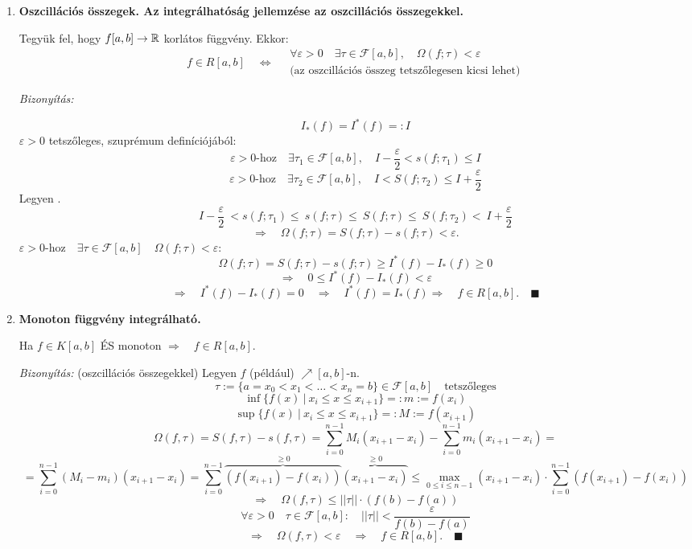 \documentclass[a4paper,11.5pt]{article}
\begin{document}
\begin{enumerate}
		\item\textbf{Oszcillációs összegek. Az integrálhatóság jellemzése az oszcillációs összegekkel.}
		\begin{framed}
			Tegyük fel, hogy $f[a,b]\to\mathbb{R}$ korlátos függvény. Ekkor:
			\[ f\in R[a,b]\quad \Leftrightarrow\quad \begin{gathered}
			\forall\varepsilon>0\quad \exists\tau\in\mathcal{F}[a,b],\quad  \varOmega(f;\tau)<\varepsilon\\
			\text{(az oszcillációs összeg tetszőlegesen kicsi lehet)}
			\end{gathered} \]
		\end{framed}
		\textit{Bizonyítás:}
		
		\fbox{$\Rightarrow:$}
		\[ I_*(f)=I^*(f)=:I \]
		$\varepsilon>0$ tetszőleges, szuprémum definíciójából:
		\[ \varepsilon>0\text{-hoz}\quad \exists\tau_1\in\mathcal{F}[a,b],\quad I-\frac{\varepsilon}{2}<s(f;\tau_1)\leq I \]
		\[ \varepsilon>0\text{-hoz}\quad \exists\tau_2\in\mathcal{F}[a,b],\quad I<S(f;\tau_2)\leq I+\frac{\varepsilon}{2} \]
		Legyen .
		\[ I-\frac{\varepsilon}{2}\ <s(f;\tau_1)\leq\  s(f;\tau)\leq\  S(f;\tau)\leq\  S(f;\tau_2)<\ I+\frac{\varepsilon}{2} \]
		\[ \Rightarrow\quad\varOmega(f;\tau)= S(f;\tau)-s(f;\tau)<\varepsilon. \]
		\fbox{$\Leftarrow:$}
		$\varepsilon>0\text{-hoz}\quad \exists\tau\in\mathcal{F}[a,b]\quad \varOmega(f;\tau)<\varepsilon:$
		\[ \varOmega(f;\tau)=S(f;\tau)-s(f;\tau)\geq I^*(f)-I_*(f)\geq 0 \]
		\[ \Rightarrow\quad 0\leq I^*(f)-I_*(f)<\varepsilon \]
		\[ \Rightarrow\quad I^*(f)-I_*(f)=0\quad \Rightarrow\quad I^*(f)=I_*(f)\Rightarrow\quad f\in R[a,b].\quad \blacksquare \]
		
		\item \textbf{Monoton függvény integrálható.}
		\begin{framed}
			\begin{center}	
				Ha $f\in K[a,b]$ ÉS monoton \quad $\Rightarrow\quad f\in R[a,b].$
			\end{center}
		\end{framed}
		\medskip
		
		\textit{Bizonyítás:} (oszcillációs összegekkel)
		Legyen $f$ (például) $\nearrow [a,b]$-n.
		\[ \tau:=\{ a=x_0<x_1<\ldots<x_n=b \}\in\mathcal{F}[a,b]\quad \text{tetszőleges} \]
		\[ \inf\{ f(x)\ | \ x_i\leq x\leq x_{i+1} \}=:m:=f(x_i) \]
		\[ \sup\{ f(x)\ | \ x_i\leq x\leq x_{i+1} \}=:M:=f(x_{i+1}) \]
		\[ \varOmega(f,\tau)=S(f,\tau)-s(f,\tau)=\sum_{i=0}^{n-1}M_i(x_{i+1}-x_i)-\sum_{i=0}^{n-1}m_i(x_{i+1}-x_i)= \]
		\[ = \sum_{i=0}^{n-1}(M_i-m_i)(x_{i+1}-x_i)=\sum_{i=0}^{n-1}\overbrace{\left(f(x_{i+1})-f(x_i)\right)}^{\geq 0}\overbrace{(x_{i+1}-x_i)}^{\geq 0}\leq \max_{0\leq i\leq n-1}(x_{i+1}-x_i)\cdot\sum_{i=0}^{n-1}(f(x_{i+1})-f(x_i))\]
		\[ \Rightarrow\quad \varOmega(f,\tau)\leq ||\tau||\cdot (f(b)-f(a)) \]
		\[ \forall\varepsilon>0\quad \tau\in\mathcal{F}[a,b]:\quad ||\tau||<\frac{\varepsilon}{f(b)-f(a)} \]
		\[ \Rightarrow\quad \varOmega(f,\tau)<\varepsilon\quad \Rightarrow\quad f\in R[a,b].\quad \blacksquare \]
		

\end{enumerate}
\end{document}
